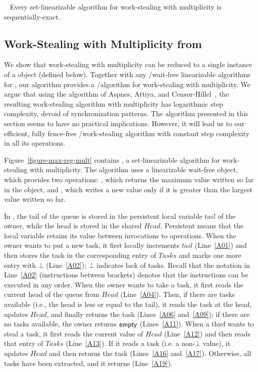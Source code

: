 \begin{remark}~\label{remark-seq-exact-set-lin}
Every set-linearizable algorithm for work-stealing with multiplicity is sequentially-exact.
\end{remark}

\subsection{\label{sec-ws-mult-max-reg}Work-Stealing with Multiplicity from \MaxReg}


We show that work-stealing with multiplicity can be reduced to a single instance of a \MaxReg object (defined below). Together with any \R/\W wait-free linearizable algorithms for \MaxReg, our algorithm provides a \R/\W algorithm for work-stealing with multiplicity. We argue that using the \MaxReg algorithm of Aspnes, Attiya, and Censor-Hillel~\cite{DBLP_journals_jacm_AspnesAC12}, the resulting work-stealing algorithm with multiplicity has logarithmic step complexity, devoid of \RAW synchronization patterns. The algorithm presented in this section seems to have no practical implications. However, it will lead us to our efficient, fully fence-free \R/\W work-stealing algorithm with constant step complexity in all its operations.

Figure~\ref{figure-max-reg-mult} contains \WFWSM, a set-linearizable algorithm for work-stealing with multiplicity. The algorithm uses a linearizable wait-free \MaxReg object, which provides two operations: \MaxR, which returns the maximum value written so far in the object, and \MaxW, which writes a new value only if it is greater than the largest value written so far.


In \WFWSM, the tail of the queue is stored in the persistent local variable \(tail\) of the owner, while the head is stored in the shared \MaxReg \(Head\). Persistent means that the local variable retains its value between invocations to operations. When the owner wants to put a new task, it first locally increments \(tail\) (Line~\ref{A01}) and then stores the task in the corresponding entry of \(Tasks\) and marks one more entry with \(\bot\) (Line~\ref{A02}); \(\bot\) indicates lack of tasks. Recall that the notation in Line~\ref{A02} (instructions between brackets) denotes that the instructions can be executed in any order. When the owner wants to take a task, it first reads the current head of the queue from \(Head\) (Line~\ref{A04}). Then, if there are tasks available (i.e., the head is less or equal to the tail), it reads the task at the head, updates \(Head\), and finally returns the task (Lines~\ref{A06} and~\ref{A09}); if there are no tasks available, the owner returns ${\sf \small empty}$ (Lines~\ref{A11}). When a thief wants to steal a task, it first reads the current value of \(Head\) (Line~\ref{A12}) and then reads that entry of \(Tasks\) (Line~\ref{A13}). If it reads a task (i.e. a non-\(\bot\) value), it updates \(Head\) and then returns the task (Lines~\ref{A16} and~\ref{A17}).  Otherwise, all tasks have been extracted, and it returns \epty (Line~\ref{A19}).


